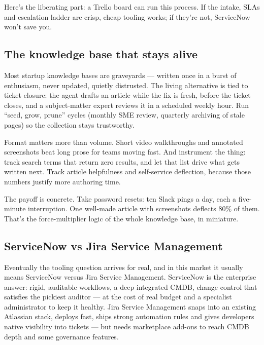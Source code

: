 Here's the liberating part: a Trello board can run this process. If the intake, SLAs and escalation ladder are crisp, cheap tooling works; if they're not, ServiceNow won't save you.



\subsection{The knowledge base that stays alive}


Most startup knowledge bases are graveyards — written once in a burst of enthusiasm, never updated, quietly distrusted. The living alternative is tied to ticket closure: the agent drafts an article while the fix is fresh, before the ticket closes, and a subject-matter expert reviews it in a scheduled weekly hour. Run ``seed, grow, prune'' cycles (monthly SME review, quarterly archiving of stale pages) so the collection stays trustworthy.


Format matters more than volume. Short video walkthroughs and annotated screenshots beat long prose for teams moving fast. And instrument the thing: track search terms that return zero results, and let that list drive what gets written next. Track article helpfulness and self-service deflection, because those numbers justify more authoring time.


The payoff is concrete. Take password resets: ten Slack pings a day, each a five-minute interruption. One well-made article with screenshots deflects 80\% of them. That's the force-multiplier logic of the whole knowledge base, in miniature.



\subsection{ServiceNow vs Jira Service Management}


Eventually the tooling question arrives for real, and in this market it usually means ServiceNow versus Jira Service Management. ServiceNow is the enterprise answer: rigid, auditable workflows, a deep integrated CMDB, change control that satisfies the pickiest auditor — at the cost of real budget and a specialist administrator to keep it healthy. Jira Service Management snaps into an existing Atlassian stack, deploys fast, ships strong automation rules and gives developers native visibility into tickets — but needs marketplace add-ons to reach CMDB depth and some governance features.


